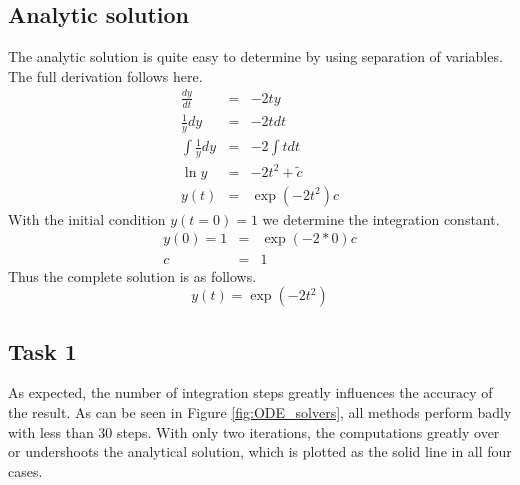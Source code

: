 \documentclass{aa}
\begin{document}
\subsection{Analytic solution}%
\label{sub:analytic_solution}

The analytic solution is quite easy to determine by using separation of variables. The full
derivation follows here.
\begin{eqnarray}
    \label{equ:analytic_solution}
    \frac{dy}{dt} & = & -2ty \\
    \frac{1}{y} dy & = & -2t dt \\
    \int \frac{1}{y} dy & = & -2 \int t dt \\ 
    \ln y & = & -2 t^2 + \tilde{c} \\
    y(t) & = & \exp\left(-2 t^2\right) c
\end{eqnarray}
With the initial condition \(y(t=0) = 1\) we determine the integration constant.
\begin{eqnarray}
    \label{equ:analytic_solution_2}
    y(0) = 1 & = & \exp\left(-2 * 0\right) c \\
    c & = & 1
\end{eqnarray}
Thus the complete solution is as follows.
\begin{equation}
    \label{eqn:analytic_solution_2}
    y(t) = \exp\left(-2 t^2\right)
\end{equation}

\subsection{Task 1}%
\label{sub:res_task_1}

As expected, the number of integration steps greatly influences the accuracy of the result. As
can be seen in Figure \ref{fig:ODE_solvers}, all methods perform badly with less than 30 steps.
With only two iterations, the computations greatly over or undershoots the analytical solution,
which is plotted as the solid line in all four cases.
\end{document}
